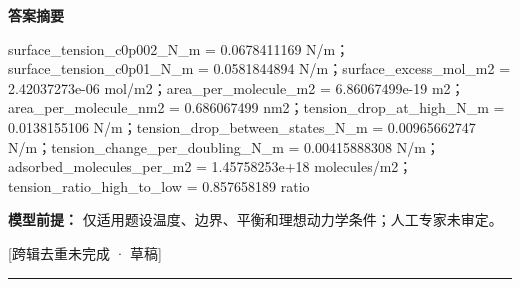 \documentclass[UTF8,11pt,a4paper]{ctexart}
\begin{document}
\noindent\textbf{答案摘要}\par
surface\_tension\_c0p002\_N\_m = 0.0678411169 N/m；surface\_tension\_c0p01\_N\_m = 0.0581844894 N/m；surface\_excess\_mol\_m2 = 2.42037273e-06 mol/m2；area\_per\_molecule\_m2 = 6.86067499e-19 m2；area\_per\_molecule\_nm2 = 0.686067499 nm2；tension\_drop\_at\_high\_N\_m = 0.0138155106 N/m；tension\_drop\_between\_states\_N\_m = 0.00965662747 N/m；tension\_change\_per\_doubling\_N\_m = 0.00415888308 N/m；adsorbed\_molecules\_per\_m2 = 1.45758253e+18 molecules/m2；tension\_ratio\_high\_to\_low = 0.857658189 ratio\par
\noindent\textbf{模型前提：}
仅适用题设温度、边界、平衡和理想动力学条件；人工专家未审定。\par
\noindent\textcolor{red!65!black}{[跨辑去重未完成 · 草稿]} \par
\medskip\hrule\medskip
{}
\end{document}
